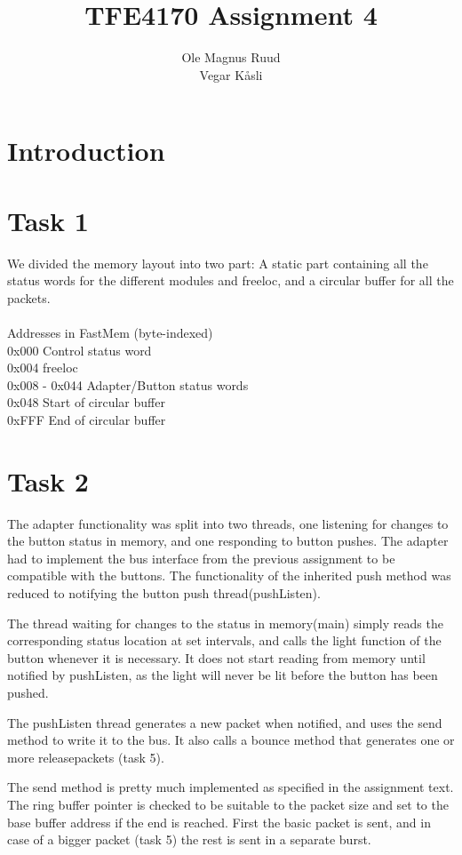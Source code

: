 \documentclass[11pt]{report}
\title{TFE4170 Assignment 4}
\author{Ole Magnus Ruud \\ Vegar K\aa sli}
\begin{document}
\maketitle
\clearpage

\section*{Introduction}


\section*{Task 1}
We divided the memory layout into two part: A static part containing all the
status words for the different modules and freeloc, and a circular buffer for
all the packets. 
\\
\\Addresses in FastMem (byte-indexed)
\\0x000 Control status word
\\0x004 freeloc
\\0x008 - 0x044 Adapter/Button status words
\\0x048 Start of circular buffer
\\0xFFF End of circular buffer

\section*{Task 2}

The adapter functionality was split into two threads, one listening for
changes to the button status in memory, and one responding to button pushes.
The adapter had to implement the bus interface from the previous assignment
to be compatible with the buttons. The functionality of the inherited push
method was reduced to notifying the button push thread(pushListen).

The thread waiting for changes to the status in memory(main) simply reads the 
corresponding status location at set intervals, and calls the light function
of the button whenever it is necessary. It does not start reading from memory
until notified by pushListen, as the light will never be lit before the button
has been pushed.

The pushListen thread generates a new packet when notified, and uses the send
method to write it to the bus. It also calls a bounce method that generates 
one or more releasepackets (task 5).

The send method is pretty much implemented as specified in the assignment text.
The ring buffer pointer is checked to be suitable to the packet size and set to 
the base buffer address if the end is reached. First the basic packet is sent, 
and in case of a bigger packet (task 5) the rest is sent in a separate burst.
\end{document}
